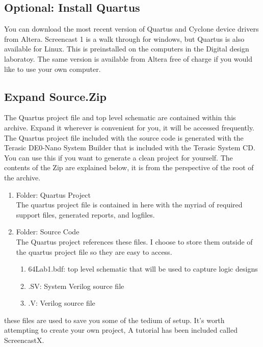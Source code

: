 \documentclass[12pt,journal]{IEEEtran}
\begin{document}
    \subsection{Optional: Install Quartus}
    You can download the most recent version of Quartus and Cyclone device drivers from Altera. Screencast 1
    is a walk through for windows, but Quartus is also available for Linux. This is preinstalled on the computers in the Digital design laboratoy. The same version is available from Altera free of charge if you would like to use your own computer.

    \subsection{Expand Source.Zip}
    The Quartus project file and top level schematic are contained within this archive. Expand it wherever is convenient for you, it will be accessed frequently. The Quartus project file included with the source code is generated with the Terasic DE0-Nano System Builder that is included with the Terasic System CD. You can use this if you want to generate a clean project for yourself. The contents of the Zip are explained below, it is from the perspective of the root of the archive.

    \begin{enumerate}
    \item Folder: Quartus Project \\
      The quartus project file is contained in here with the myriad of required support files, generated reports, and logfiles.
    \item Folder: Source Code \\
      The Quartus project references these files. I choose to store them outside of the quartus project file so they are easy to access.
      \begin{enumerate}
        \item 64Lab1.bdf: top level schematic that will be used to capture logic designs
        \item .SV: System Verilog source file
        \item .V: Verilog source file
      \end{enumerate}
    \end{enumerate}
    these files are used to save you some of the tedium of setup. It's worth attempting to create your own project, A tutorial has been included called ScreencastX.
    
\end{document}
